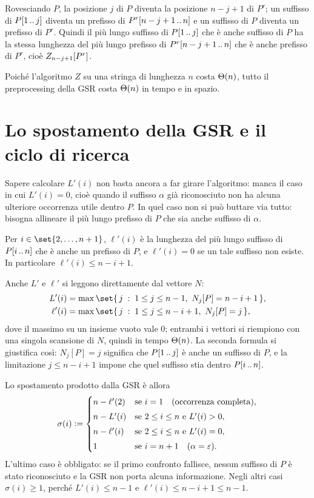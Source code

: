 \begin{osservazione}
Rovesciando $P$, la posizione $j$ di $P$ diventa la posizione $n-j+1$ di $P^r$; un
suffisso di $P[1\,..\,j]$ diventa un prefisso di $P^r[n-j+1\,..\,n]$ e un
suffisso di $P$ diventa un prefisso di $P^r$. Quindi il più lungo suffisso di
$P[1\,..\,j]$ che è anche suffisso di $P$ ha la stessa lunghezza del più lungo
prefisso di $P^r[n-j+1\,..\,n]$ che è anche prefisso di $P^r$, cioè
$Z_{n-j+1}[P^r]$.

Poiché l'algoritmo $Z$ su una stringa di lunghezza $n$ costa $\Theta(n)$, tutto il
preprocessing della GSR costa $\Theta(n)$ in tempo e in spazio.
\end{osservazione}

\section{Lo spostamento della GSR e il ciclo di ricerca}\label{sec:bm-ricerca}

Sapere calcolare $L'(i)$ non basta ancora a far girare l'algoritmo: manca il caso in
cui $L'(i)=0$, cioè quando il suffisso $\alpha$ già riconosciuto non ha alcuna
ulteriore occorrenza utile dentro $P$. In quel caso non si può buttare via tutto:
bisogna allineare il più lungo prefisso di $P$ che sia anche suffisso di $\alpha$.

\begin{definizione}[$\ell'(i)$]\label{def:bm-lminuscolo}
Per $i\in\set{2,\dots,n+1}$, $\ell'(i)$ è la lunghezza del più lungo suffisso di
$P[i\,..\,n]$ che è anche un prefisso di $P$, e $\ell'(i)=0$ se un tale suffisso
non esiste. In particolare $\ell'(i)\le n-i+1$.
\end{definizione}

Anche $L'$ e $\ell'$ si leggono direttamente dal vettore $N$:
\begin{align*}
  L'(i) &= \max\set{\,j \;:\; 1\le j\le n-1,\ N_j[P]=n-i+1\,},\\
  \ell'(i) &= \max\set{\,j \;:\; 1\le j\le n-i+1,\ N_j[P]=j\,},
\end{align*}
dove il massimo su un insieme vuoto vale $0$; entrambi i vettori si riempiono con
una singola scansione di $N$, quindi in tempo $\Theta(n)$. La seconda formula si
giustifica così: $N_j[P]=j$ significa che $P[1\,..\,j]$ è anche un suffisso di $P$, e
la limitazione $j\le n-i+1$ impone che quel suffisso stia dentro $P[i\,..\,n]$.

Lo spostamento prodotto dalla GSR è allora
\[
  \sigma(i)\vcentcolon=
  \begin{cases}
    n-\ell'(2) & \text{se } i=1 \quad (\text{occorrenza completa}),\\[3pt]
    n-L'(i)  & \text{se } 2\le i\le n \ \text{e}\ L'(i)>0,\\[3pt]
    n-\ell'(i) & \text{se } 2\le i\le n \ \text{e}\ L'(i)=0,\\[3pt]
    1        & \text{se } i=n+1 \quad (\alpha=\varepsilon).
  \end{cases}
\]
L'ultimo caso è obbligato: se il primo confronto fallisce, nessun suffisso di $P$ è
stato riconosciuto e la GSR non porta alcuna informazione. Negli altri casi
$\sigma(i)\ge 1$, perché $L'(i)\le n-1$ e $\ell'(i)\le n-i+1\le n-1$.


